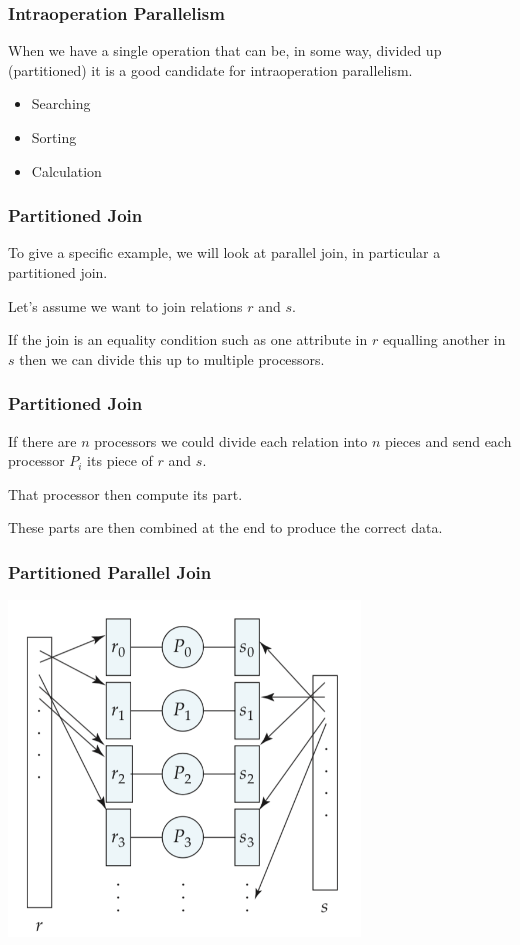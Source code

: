 \begin{frame}
\frametitle{Intraoperation Parallelism}

When we have a single operation that can be, in some way, divided up (partitioned) it is a good candidate for intraoperation parallelism. 

\begin{itemize}
	\item Searching
	\item Sorting
	\item Calculation
\end{itemize}

\end{frame}

\begin{frame}
\frametitle{Partitioned Join}

To give a specific example, we will look at parallel join, in particular a partitioned join. 

Let's assume we want to join relations $r$ and $s$. 

If the join is an equality condition such as one attribute in $r$ equalling another in $s$ then we can divide this up to multiple processors.

\end{frame}

\begin{frame}
\frametitle{Partitioned Join}
If there are $n$ processors we could divide each relation into $n$ pieces and send each processor $P_{i}$ its piece of $r$ and $s$. 

That processor then compute its part. 

These parts are then combined at the end to produce the correct data. 


\end{frame}

\begin{frame}
\frametitle{Partitioned Parallel Join}

\begin{center}
\includegraphics[width=0.7\textwidth]{images/partitioned-parallel-join}
\end{center}

\end{frame}

